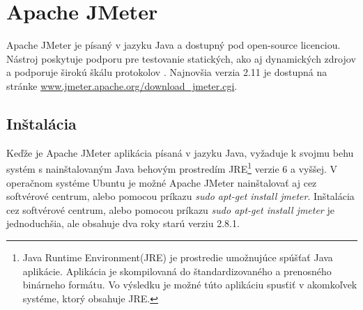 \documentclass[12pt,oneside,final]{fithesis-utf8}
\begin{document}
\section{Apache JMeter}
Apache JMeter je písaný v jazyku Java a dostupný pod open-source licenciou. Nástroj poskytuje podporu pre testovanie statických, ako aj dynamických zdrojov a podporuje širokú škálu protokolov \cite{Apache}. Najnovšia verzia 2.11 je dostupná na stránke \url{www.jmeter.apache.org/download_jmeter.cgi}.

\subsection{Inštalácia}
Keďže je Apache JMeter aplikácia písaná v jazyku Java, vyžaduje k svojmu behu systém s nainštalovaným Java behovým prostredím JRE\footnote{Java Runtime Environment(JRE) je prostredie umožnujúce spúšťať Java aplikácie. Aplikácia je skompilovaná do štandardizovaného a prenosného binárneho formátu. Vo výsledku je možné túto aplikáciu spusťiť v akomkoľvek systéme, ktorý obsahuje JRE.} verzie 6 a vyššej. V operačnom systéme Ubuntu je možné Apache JMeter nainštalovať aj cez softvérové centrum, alebo pomocou príkazu \textit{sudo apt-get install jmeter}. Inštalácia cez softvérové centrum, alebo pomocou príkazu \textit{sudo apt-get install jmeter} je jednoduchšia, ale obsahuje dva roky starú verziu 2.8.1.
\end{document}
